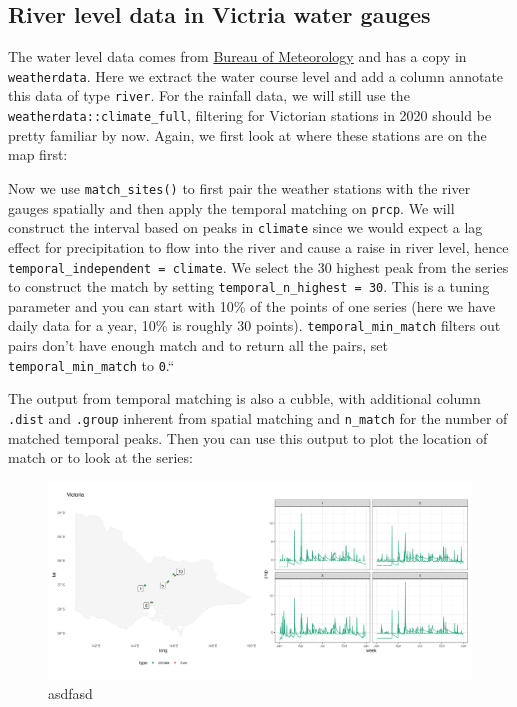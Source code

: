 \documentclass[
]{jss}
\begin{document}
\hypertarget{river-level-data-in-victria-water-gauges}{%
\subsection{River level data in Victria water
gauges}\label{river-level-data-in-victria-water-gauges}}

The water level data comes from
\href{http://www.bom.gov.au/metadata/catalogue/19115/ANZCW0503900528?template=full}{Bureau
of Meteorology} and has a copy in \texttt{weatherdata}. Here we extract
the water course level and add a column annotate this data of type
\texttt{river}. For the rainfall data, we will still use the
\texttt{weatherdata::climate\_full}, filtering for Victorian stations in
2020 should be pretty familiar by now. Again, we first look at where
these stations are on the map first:

Now we use \texttt{match\_sites()} to first pair the weather stations
with the river gauges spatially and then apply the temporal matching on
\texttt{prcp}. We will construct the interval based on peaks in
\texttt{climate} since we would expect a lag effect for precipitation to
flow into the river and cause a raise in river level, hence
\texttt{temporal\_independent\ =\ climate}. We select the 30 highest
peak from the series to construct the match by setting
\texttt{temporal\_n\_highest\ =\ 30}. This is a tuning parameter and you
can start with 10\% of the points of one series (here we have daily data
for a year, 10\% is roughly 30 points). \texttt{temporal\_min\_match}
filters out pairs don't have enough match and to return all the pairs,
set \texttt{temporal\_min\_match} to \texttt{0}.``

The output from temporal matching is also a cubble, with additional
column \texttt{.dist} and \texttt{.group} inherent from spatial matching
and \texttt{n\_match} for the number of matched temporal peaks. Then you
can use this output to plot the location of match or to look at the
series:

\begin{CodeChunk}
\begin{figure}

{\centering \includegraphics[width=1\linewidth,height=0.3\textheight]{figures/matching} 

}

\caption[asdfasd]{asdfasd}\label{fig:matching}
\end{figure}
\end{CodeChunk}
\end{document}
